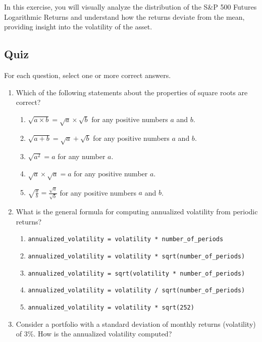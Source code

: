 \documentclass{article}
\begin{document}
In this exercise, you will visually analyze the distribution of the S\&P 500 Futures Logarithmic Returns and understand how the returns deviate from the mean, providing insight into the volatility of the asset.


\subsection{Quiz}
For each question, select one or more correct answers.

\begin{enumerate}

\item Which of the following statements about the properties of square roots are correct?
    \begin{enumerate}
        \item $\sqrt{a \times b} = \sqrt{a} \times \sqrt{b}$ for any positive numbers \(a\) and \(b\).
        \item $\sqrt{a + b} = \sqrt{a} + \sqrt{b}$ for any positive numbers \(a\) and \(b\).
        \item $\sqrt{a^2} = a$ for any number \(a\).
        \item $\sqrt{a} \times \sqrt{a} = a$ for any positive number \(a\).
        \item $\sqrt{\frac{a}{b}} = \frac{\sqrt{a}}{\sqrt{b}}$ for any positive numbers \(a\) and \(b\).
    \end{enumerate}

    \item What is the general formula for computing annualized volatility from periodic returns?
    \begin{enumerate}
        \item \texttt{annualized\_volatility = volatility * number\_of\_periods}
        \item \texttt{annualized\_volatility = volatility * sqrt(number\_of\_periods)}
        \item \texttt{annualized\_volatility = sqrt(volatility * number\_of\_periods)}
        \item \texttt{annualized\_volatility = volatility / sqrt(number\_of\_periods)}
        \item \texttt{annualized\_volatility = volatility * sqrt(252)}
    \end{enumerate}

    \item Consider a portfolio with a standard deviation of monthly returns (volatility) of 3\%. How is the annualized volatility computed?
    

\end{enumerate}
\end{document}
